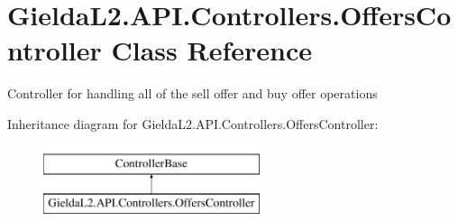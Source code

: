 \hypertarget{class_gielda_l2_1_1_a_p_i_1_1_controllers_1_1_offers_controller}{}\section{Gielda\+L2.\+A\+P\+I.\+Controllers.\+Offers\+Controller Class Reference}
\label{class_gielda_l2_1_1_a_p_i_1_1_controllers_1_1_offers_controller}


Controller for handling all of the sell offer and buy offer operations  


Inheritance diagram for Gielda\+L2.\+A\+P\+I.\+Controllers.\+Offers\+Controller\+:\begin{figure}[H]
\begin{center}
\leavevmode
\includegraphics[height=2.000000cm]{class_gielda_l2_1_1_a_p_i_1_1_controllers_1_1_offers_controller}
\end{center}
\end{figure}
